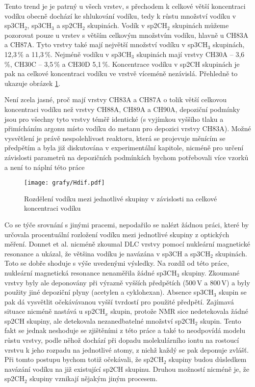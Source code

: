 Tento trend je je patrný u všech vrstev, s přechodem k celkové větší koncentraci vodíku obecně dochází ke shlukování vodíku, tedy k růstu množství vodíku v sp3CH$_2$, sp3CH$_3$ a sp2CH$_2$ skupinách. Vodík v sp2CH$_2$ skupinách můžeme pozorovat pouze u vrstev s větším celkovým množstvím vodíku, hlavně u CH83A a CH87A. Tyto vrstvy také mají největší množství vodíku v sp3CH$_3$ skupinách, 12,3\,\% a 11,3\,\%. Nejméně vodíku v sp3CH$_3$ skupinách mají vrstvy CH30A -- 3,6\,\%, CH30C -- 3,5\,\% a CH30D 5,1\,\%. Koncentrace vodíku v sp2CH skupinách je pak na celkové koncentraci vodíku ve vrstvě víceméně nezávislá. Přehledně to ukazuje obrázek \ref{Hdif}.

Není zcela jasné, proč mají vrstvy CH83A a CH87A o tolik větší celkovou koncentraci vodíku než vrstvy CH88A, CH89A a CH90A, depoziční podmínky jsou pro všechny tyto vrstvy téměř identické (s vyjímkou vyššího tlaku a přimícháním argonu místo vodíku do metanu pro depozici vrstvy CH83A). 
Možné vysvětlení je právě nespolehlivost reaktoru, která se projevuje měnícím se předpětím a byla již diskutována v experimentální kapitole, nicméně pro určení závislosti parametrů na depozičních podmínkách bychom potřebovali více vzorků a není to náplní této práce

\begin{figure}[tbhp]
	\texttt{[image: grafy/Hdif.pdf]}
	\caption{Rozdělení vodíku mezi jednotlivé skupiny v závislosti na celkové koncentraci vodíku}
	\label{Hdif}
\end{figure}

Co se týče srovnání s jinými pracemi, nepodařilo se nalézt žádnou práci, které by určovala procentuální rozložení vodíku mezi jednotlivé skupiny z optických měření. Donnet et al. \cite{Donnet1999} nicméně zkoumal DLC vrstvy pomocí nukleární magnetické resonance a ukázal, že většina vodíku je navázána v sp3CH a sp3CH$_2$ skupinách. 
Toto se dobře shoduje s výše uvedenými výsledky. Na rozdíl od této práce, nukleární magnetická resonance nenaměřila žádné sp3CH$_3$ skupiny. Zkoumané vrstvy byly ale deponovány při výrazně vyšších předpětích (500\,V a 800\,V) a byly použity jiné depoziční plyny (acetylen a cyklohexan). Absence sp3CH$_3$ skupin se pak dá vysvětlit očekávávanou vyšší tvrdostí pro použité předpětí. Zajímavá situace nicméně nastává u sp2CH$_x$ skupin, protože NMR sice nedetekovala žádné sp2CH skupiny, ale detekovala nezanedbatelné množství sp2CH$_2$ skupin. 
Tento fakt se jednak neshoduje se zjištěními z této práce a také to neodpovídá modelu růstu vrstvy, podle něhož dochází při dopadu molekulárního iontu na rostoucí vrstvu k jeho rozpadu na jednotlivé atomy, z nichž každý se pak deponuje zvlášť. Při tomto postupu bychom totiž očekávali, že sp2CH$_2$ skupiny budou důsledkem navázání vodíku na již existující sp2CH skupinu. Druhou možností nicméně je, že sp2CH$_2$ skupiny vznikají nějakým jiným procesem.

